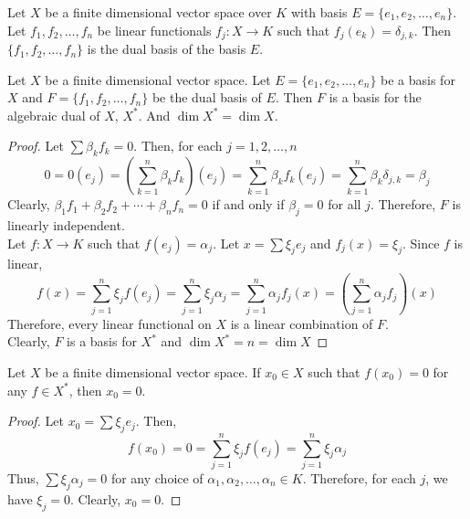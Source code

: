\begin{definition}
	Let $X$ be a finite dimensional vector space over $K$ with basis $E = \{e_1,e_2,\dots,e_n\}$.
	Let $f_1,f_2,\dots,f_n$ be linear functionals $f_j : X \to K$ such that $f_j(e_k) = \delta_{j,k}$.
	Then $\{f_1,f_2,\dots,f_n\}$ is the dual basis of the basis $E$.
\end{definition}

\begin{theorem}
	Let $X$ be a finite dimensional vector space.
	Let $E = \{ e_1,e_2,\dots,e_n \}$ be a basis for $X$ and $F = \{ f_1,f_2,\dots,f_n \}$ be the dual basis of $E$.
	Then $F$ is a basis for the algebraic dual of $X$, $X^\ast$.
	And $\dim X^\ast = \dim X$.
\end{theorem}
\begin{proof}
	Let $\sum \beta_k f_k = 0$.
	Then, for each $j = 1,2,\dots,n $
	\[ 0 = 0(e_j) = \left( \sum_{k = 1}^n \beta_k f_k\right)(e_j) =\sum_{k = 1}^n \beta_k f_k(e_j) =\sum_{k = 1}^n \beta_k \delta_{j,k} = \beta_j \]
	Clearly, $\beta_1f_1+\beta_2f_2+\dotsb+\beta_nf_n = 0$ if and only if $\beta_j = 0$ for all $j$.
	Therefore, $F$ is linearly independent.\\

	Let $f : X \to K$ such that $f(e_j) = \alpha_j$.
	Let $x = \sum \xi_j e_j$ and $f_j(x) = \xi_j$.
	Since $f$ is linear, 
	\[ f(x) = \sum_{j=1}^n \xi_j f(e_j) = \sum_{j=1}^n \xi_j \alpha_j = \sum_{j=1}^n \alpha_j f_j(x) = \left( \sum_{j=1}^n \alpha_j f_j \right) (x) \]
	Therefore, every linear functional on $X$ is a linear combination of $F$.\\
	Clearly, $F$ is a basis for $X^\ast$ and $\dim X^\ast = n = \dim X$
\end{proof}

\begin{lemma}
	Let $X$ be a finite dimensional vector space.
	If $x_0 \in X$ such that $f(x_0) = 0$ for any $f \in X^\ast$, then $x_0 = 0$.
\end{lemma}
\begin{proof}
	Let $x_0 = \sum \xi_j e_j$.
	Then,
	\[ f(x_0) = 0 = \sum_{j=1}^n \xi_j f(e_j) = \sum_{j=1}^n \xi_j \alpha_j \]
	Thus, $\sum \xi_j \alpha_j = 0$ for any choice of $\alpha_1,\alpha_2,\dots,\alpha_n \in K$.
	Therefore, for each $j$, we have $\xi_j = 0$.
	Clearly, $x_0 = 0$.
\end{proof}

